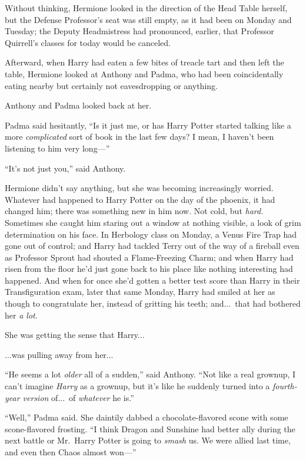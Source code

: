 Without thinking, Hermione looked in the direction of the Head Table herself, but the Defense Professor’s seat was still empty, as it had been on Monday and Tuesday; the Deputy Headmistress had pronounced, earlier, that Professor Quirrell’s classes for today would be canceled.

Afterward, when Harry had eaten a few bites of treacle tart and then left the table, Hermione looked at Anthony and Padma, who had been coincidentally eating nearby but certainly not eavesdropping or anything.

Anthony and Padma looked back at her.

Padma said hesitantly, “Is it just me, or has Harry Potter started talking like a more \emph{complicated} sort of book in the last few days? I mean, I haven’t been listening to him very long—”

“It’s not just you,” said Anthony.

Hermione didn’t say anything, but she was becoming increasingly worried. Whatever had happened to Harry Potter on the day of the phoenix, it had changed him; there was something new in him now. Not cold, but \emph{hard.} Sometimes she caught him staring out a window at nothing visible, a look of grim determination on his face. In Herbology class on Monday, a Venus Fire Trap had gone out of control; and Harry had tackled Terry out of the way of a fireball even as Professor Sprout had shouted a Flame-Freezing Charm; and when Harry had risen from the floor he’d just gone back to his place like nothing interesting had happened. And when for once she’d gotten a better test score than Harry in their Transfiguration exam, later that same Monday, Harry had smiled at her as though to congratulate her, instead of gritting his teeth; and...\ that had bothered her \emph{a lot}.

She was getting the sense that Harry...

...was pulling away from her...

“He seems a lot \emph{older} all of a sudden,” said Anthony. “Not like a real grownup, I can’t imagine \emph{Harry} as a grownup, but it’s like he suddenly turned into a \emph{fourth-year version} of...\ of \emph{whatever} he is.”

“Well,” Padma said. She daintily dabbed a chocolate-flavored scone with some scone-flavored frosting. “I think Dragon and Sunshine had better ally during the next battle or Mr.~Harry Potter is going to \emph{smash} us. We were allied last time, and even then Chaos almost won—”

